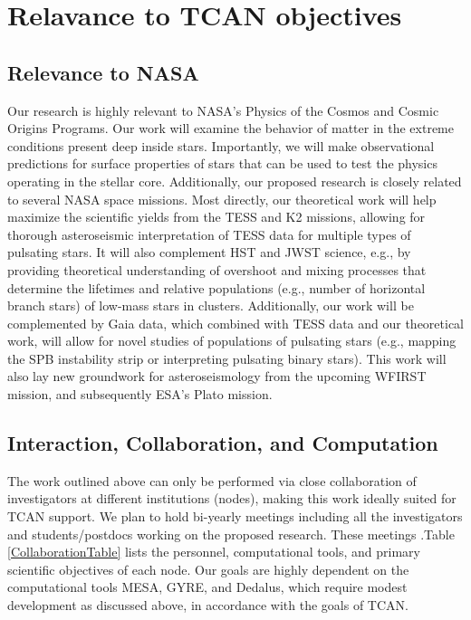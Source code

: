{\color{orange}
\section{Relavance to TCAN objectives}
}

{\color{orange}
\subsection{Relevance to NASA}
}

Our research is highly relevant to NASA's Physics of the Cosmos and Cosmic Origins Programs. Our work will examine the behavior of matter in the extreme conditions present deep inside stars. Importantly, we will make observational predictions for surface properties of stars that can be used to test the physics operating in the stellar core. Additionally, our proposed research is closely related to several NASA space missions. Most directly, our theoretical work will help maximize the scientific yields from the TESS and K2 missions, allowing for thorough asteroseismic interpretation of TESS data for multiple types of pulsating stars. It will also complement HST and JWST science, e.g., by providing theoretical understanding of overshoot and mixing processes that determine the lifetimes and relative populations (e.g., number of horizontal branch stars) of low-mass stars in clusters. Additionally, our work will be complemented by Gaia data, which combined with TESS data and our theoretical work, will allow for novel studies of populations of pulsating stars (e.g., mapping the SPB instability strip or interpreting pulsating binary stars). This work will also lay new groundwork for asteroseismology from the upcoming WFIRST mission, and subsequently ESA's Plato mission. 


{\color{orange}
\subsection{Interaction, Collaboration, and Computation}
}

The work outlined above can only be performed via close collaboration of investigators at different institutions (nodes), making this work ideally suited for TCAN support. We plan to hold bi-yearly meetings including all the investigators and students/postdocs working on the proposed research. These meetings .Table \ref{CollaborationTable} lists the personnel, computational tools, and primary scientific objectives of each node. Our goals are highly dependent on the computational tools MESA, GYRE, and Dedalus, which require modest development as discussed above, in accordance with the goals of TCAN.



